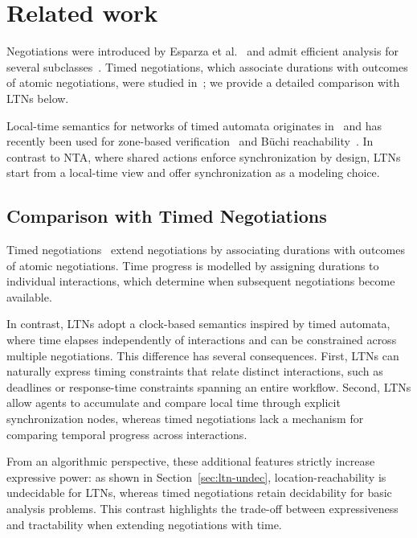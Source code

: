 
\section{Related work}
\label{sec:ltn-related}

Negotiations were introduced by Esparza et al.~\cite{DBLP:conf/concur/EsparzaD13,DBLP:journals/acta/DeselEH19}
and admit efficient analysis for several subclasses~\cite{DBLP:journals/lmcs/EsparzaKMW18,DBLP:conf/lics/EsparzaMW17}.
Timed negotiations, which associate durations with outcomes of atomic
negotiations, were studied in~\cite{DBLP:conf/fossacs/AkshayGHM20}; we provide a
detailed comparison with LTNs below.

Local-time semantics for networks of timed automata originates
in~\cite{DBLP:conf/concur/BengtssonJLY98} and has recently been used for
zone-based verification~\cite{DBLP:conf/concur/GovindHSW19,DBLP:conf/lics/0001HSW22}
and B\"uchi reachability~\cite{DBLP:conf/concur/HerbreteauSW22}.  In contrast to
NTA, where shared actions enforce synchronization by design, LTNs start from a
local-time view and offer synchronization as a modeling choice.

\subsection{Comparison with Timed Negotiations~\cite{DBLP:conf/fossacs/AkshayGHM20}}
\label{subsec:ltn-vs-tn}

Timed negotiations~\cite{DBLP:conf/fossacs/AkshayGHM20} extend negotiations
by associating durations with outcomes of atomic negotiations.
Time progress is modelled by assigning durations to individual interactions,
which determine when subsequent negotiations become available.

In contrast, LTNs adopt a clock-based semantics inspired by timed automata,
where time elapses independently of interactions and can be constrained
across multiple negotiations.  This difference has several consequences.
First, LTNs can naturally express timing constraints that relate distinct
interactions, such as deadlines or response-time constraints spanning an
entire workflow.  Second, LTNs allow agents to accumulate and compare local
time through explicit synchronization nodes, whereas timed negotiations
lack a mechanism for comparing temporal progress across interactions.

From an algorithmic perspective, these additional features strictly
increase expressive power: as shown in Section~\ref{sec:ltn-undec},
location-reachability is undecidable for LTNs, whereas timed negotiations
retain decidability for basic analysis problems.  This contrast highlights
the trade-off between expressiveness and tractability when extending
negotiations with time.

